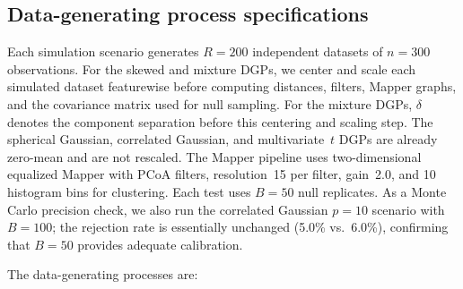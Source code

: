 \documentclass[hidelinks]{siamart251216}
\begin{document}
\subsection{Data-generating process specifications}\label{sm:dgp}

Each simulation scenario generates $R = 200$ independent datasets of
$n = 300$ observations.  For the skewed and mixture DGPs, we center and scale each simulated
dataset featurewise before computing distances,
filters, Mapper graphs, and the covariance matrix used for null sampling.
For the mixture DGPs, $\delta$ denotes the component separation before
this centering and scaling step.
The spherical Gaussian, correlated Gaussian, and multivariate~$t$ DGPs
are already zero-mean and are not rescaled.  The Mapper pipeline uses two-dimensional
equalized Mapper with PCoA filters, resolution~15 per filter,
gain~2.0, and 10 histogram bins for clustering.  Each test uses
$B = 50$ null replicates.  As a Monte Carlo precision check, we also
run the correlated Gaussian $p = 10$ scenario with $B = 100$; the
rejection rate is essentially unchanged (5.0\% vs.\ 6.0\%), confirming
that $B = 50$ provides adequate calibration.

The data-generating processes are:
\end{document}
